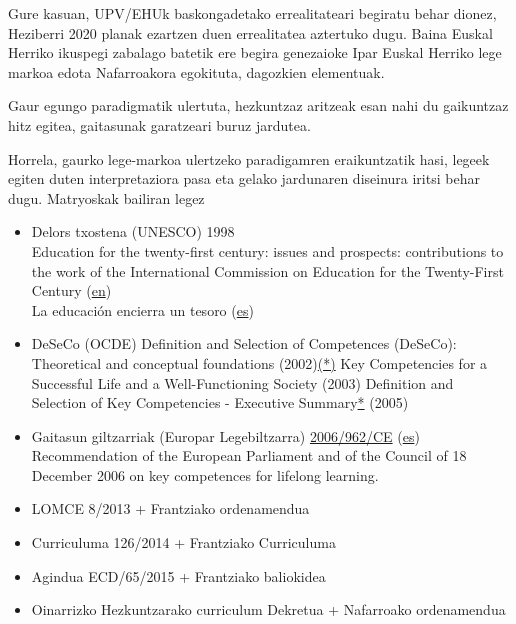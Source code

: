 \documentclass[
]{book}
\providecommand{\tightlist}{%
  \setlength{\itemsep}{0pt}\setlength{\parskip}{0pt}}
\begin{document}
Gure kasuan, UPV/EHUk baskongadetako errealitateari begiratu behar dionez, Heziberri 2020 planak ezartzen duen errealitatea aztertuko dugu. Baina Euskal Herriko ikuspegi zabalago batetik ere begira genezaioke Ipar Euskal Herriko lege markoa edota Nafarroakora egokituta, dagozkien elementuak.

Gaur egungo paradigmatik ulertuta, hezkuntzaz aritzeak esan nahi du gaikuntzaz hitz egitea, gaitasunak garatzeari buruz jardutea.

Horrela, gaurko lege-markoa ulertzeko paradigamren eraikuntzatik hasi, legeek egiten duten interpretaziora pasa eta gelako jardunaren diseinura iritsi behar dugu. Matryoskak bailiran legez

\begin{itemize}
\tightlist
\item
  Delors txostena (UNESCO) 1998\\
  Education for the twenty-first century: issues and prospects: contributions to the work of the International Commission on Education for the Twenty-First Century (\href{http://unesdoc.unesco.org/images/0011/001147/114766e.pdf}{en})\\
  La educación encierra un tesoro (\href{http://www.unesco.org/education/pdf/DELORS_S.PDF}{es})
\item
  DeSeCo (OCDE)
  Definition and Selection of Competences (DeSeCo): Theoretical and conceptual foundations (2002)\href{http://deseco.ch/bfs/deseco/en/index/02.parsys.34116.downloadList.87902.DownloadFile.tmp/oecddesecostrategypaperdeelsaedcericd20029.pdf}{(*)}
  Key Competencies for a Successful Life and a Well-Functioning Society (2003)
  Definition and Selection of Key Competencies - Executive Summary\href{http://deseco.ch/bfs/deseco/en/index/02.parsys.43469.downloadList.2296.DownloadFile.tmp/2005.dskcexecutivesummary.en.pdf}{*} (2005)
\item
  Gaitasun giltzarriak (Europar Legebiltzarra)
  \href{http://eur-lex.europa.eu/legal-content/EN/TXT/?uri=CELEX:32006H0962}{2006/962/CE} (\href{http://infofpe.cea.es/fpe/norm/Rec\%2018_2006.pdf}{es})
  Recommendation of the European Parliament and of the Council of 18 December 2006 on key competences for lifelong learning.
\item
  LOMCE 8/2013 + Frantziako ordenamendua
\item
  Curriculuma 126/2014 + Frantziako Curriculuma
\item
  Agindua ECD/65/2015 + Frantziako baliokidea
\item
  Oinarrizko Hezkuntzarako curriculum Dekretua + Nafarroako ordenamendua
\end{itemize}
\end{document}
